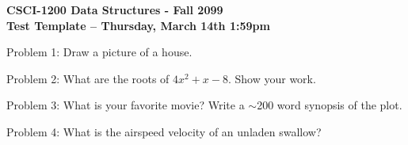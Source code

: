 \documentclass[10pt]{article}
\begin{document}
\begin{center}
  \LARGE \textbf{
    CSCI-1200 Data Structures - Fall 2099\\
    Test Template -- Thursday, March 14th 1:59pm }
\end{center}

\vspace{2in}

Problem 1: Draw a picture of a house.

\fbox{\parbox{6.9in}{ \ \vspace{3in} \ }}

\vspace{0.2in}



Problem 2: What are the roots of $ 4x^2 + x -8 $.  Show your work.

\fbox{\parbox{6.9in}{ \ \vspace{3in} \ }}

\newpage

Problem 3: What is your favorite movie?  Write a $\sim$200 word
synopsis of the plot.

\fbox{\parbox{6.9in}{ \ \vspace{9.5in} \ }}

\newpage

Problem 4: What is the airspeed velocity of an unladen swallow?

\fbox{\parbox{6.9in}{ \ \vspace{9.5in} \ }}
\end{document}
